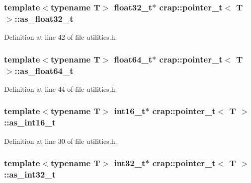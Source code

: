 \hypertarget{structcrap_1_1pointer__t_abf47bccc7d7e58456107e9e32000aa7f}{
\subsubsection[{as\+\_\+float32\+\_\+t}]{\setlength{\rightskip}{0pt plus 5cm}template$<$typename T$>$ {\bf float32\+\_\+t}$\ast$ {\bf crap\+::pointer\+\_\+t}$<$ T $>$\+::as\+\_\+float32\+\_\+t}}\label{structcrap_1_1pointer__t_abf47bccc7d7e58456107e9e32000aa7f}


Definition at line 42 of file utilities.\+h.

\hypertarget{structcrap_1_1pointer__t_ae0aa92260ed533bcb965a1d3cc45349a}{
\subsubsection[{as\+\_\+float64\+\_\+t}]{\setlength{\rightskip}{0pt plus 5cm}template$<$typename T$>$ {\bf float64\+\_\+t}$\ast$ {\bf crap\+::pointer\+\_\+t}$<$ T $>$\+::as\+\_\+float64\+\_\+t}}\label{structcrap_1_1pointer__t_ae0aa92260ed533bcb965a1d3cc45349a}


Definition at line 44 of file utilities.\+h.

\hypertarget{structcrap_1_1pointer__t_af49743e61d30272abb1a93697114aaa9}{
\subsubsection[{as\+\_\+int16\+\_\+t}]{\setlength{\rightskip}{0pt plus 5cm}template$<$typename T$>$ int16\+\_\+t$\ast$ {\bf crap\+::pointer\+\_\+t}$<$ T $>$\+::as\+\_\+int16\+\_\+t}}\label{structcrap_1_1pointer__t_af49743e61d30272abb1a93697114aaa9}


Definition at line 30 of file utilities.\+h.

\hypertarget{structcrap_1_1pointer__t_a15321a6137835f60c744f2f98a0a3f3d}{
\subsubsection[{as\+\_\+int32\+\_\+t}]{\setlength{\rightskip}{0pt plus 5cm}template$<$typename T$>$ int32\+\_\+t$\ast$ {\bf crap\+::pointer\+\_\+t}$<$ T $>$\+::as\+\_\+int32\+\_\+t}}\label{structcrap_1_1pointer__t_a15321a6137835f60c744f2f98a0a3f3d}



